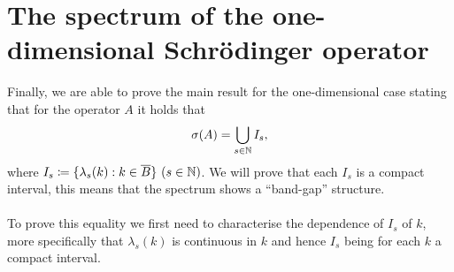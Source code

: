 \chapter{The spectrum of the one-dimensional Schrödinger operator} \label{chap:6}
Finally, we are able to prove the main result for the one-dimensional case stating that for the operator $A$ it holds that
	\begin{equation}
		\sigma(A) = \bigcup_{s \in \mathbb{N}} I_{s}, \label{MainResult}
	\end{equation}
where $I_{s} \coloneqq \{ \lambda_{s}(k) : k \in \overline{B} \} ~(s \in \mathbb{N})$. We will prove that  each $I_{s}$ is a compact interval, this means that the spectrum shows a \enquote{band-gap} structure. 
~\\ ~\\
To prove this equality we first need to characterise the dependence of $I_{s}$ of $k$, more specifically that $\lambda_{s}(k)$ is continuous in $k$ and hence $I_{s}$ being for each $k$ a compact interval.

